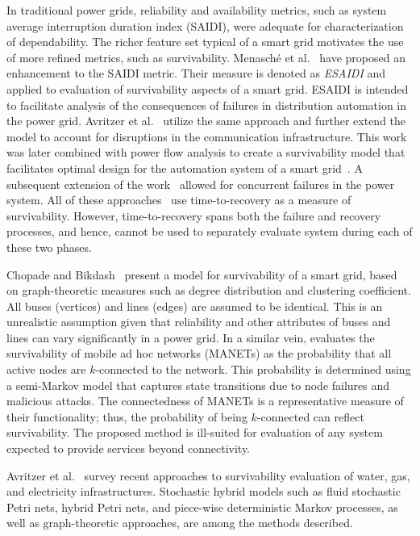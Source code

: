 \documentclass[review]{elsarticle}
\begin{document}
In traditional power grids, reliability and availability metrics, such as system average interruption duration index (SAIDI), were adequate for characterization of dependability. The richer feature set typical of a smart grid motivates the use of more refined metrics, such as survivability. Menasch{\'e} et al.~\cite{MeM12} have proposed an enhancement to the SAIDI metric. Their measure is denoted as \emph{ESAIDI} and applied to evaluation of survivability aspects of a smart grid. ESAIDI is intended to facilitate analysis of the consequences of failures in distribution automation in the power grid. Avritzer et al.~\cite{AvS13} utilize the same approach and further extend the model to account for disruptions in the communication infrastructure. This work was later combined with power flow analysis to create a survivability model that facilitates optimal design for the automation system of a smart grid~\cite{KoA13}. A subsequent extension of the work~\cite{MeA14} allowed for concurrent failures in the power system. All of these approaches~\cite{MeM12,AvS13,KoA13,MeA14} use time-to-recovery as a measure of survivability. However, time-to-recovery spans both the failure and recovery processes, and hence, cannot be used to separately evaluate system during each of these two phases.

Chopade and Bikdash~\cite{ChB12} present a model for survivability of a smart grid, based on graph-theoretic measures such as degree distribution and clustering coefficient. All buses (vertices) and lines (edges) are assumed to be identical. This is an unrealistic assumption given that reliability and other attributes of buses and lines can vary significantly in a power grid. In a similar vein, \cite{YiD15} evaluates the survivability of mobile ad hoc networks (MANETs) as the probability that all active nodes are $k$-connected to the network. This probability is determined using a semi-Markov model that captures state transitions due to node failures and malicious attacks. The connectedness of MANETs is a representative measure of their functionality; thus, the probability of being $k$-connected can reflect survivability. The proposed method is ill-suited for evaluation of any system expected to provide services beyond connectivity.

Avritzer et al.~\cite{AvC15} survey recent approaches to survivability evaluation of water, gas, and electricity infrastructures. Stochastic hybrid models such as fluid stochastic Petri nets, hybrid Petri nets, and piece-wise deterministic Markov processes, as well as graph-theoretic approaches, are among the methods described.
\end{document}
